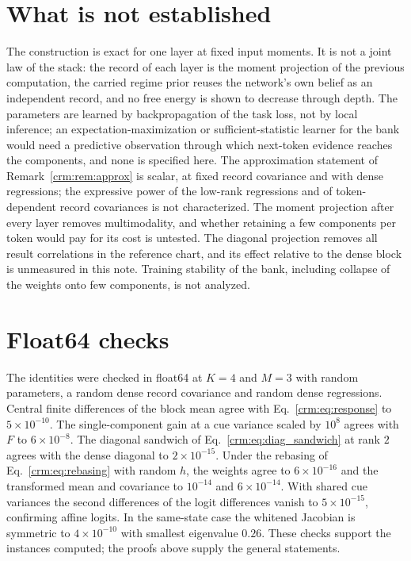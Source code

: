 \documentclass[11pt]{article}
\theoremstyle{definition}
\theoremstyle{remark}
\begin{document}
\section{What is not established}
\label{crm:sec:open}

The construction is exact for one layer at fixed input moments. It is not a joint law of the stack: the record of each layer is the moment projection of the previous computation, the carried regime prior reuses the network's own belief as an independent record, and no free energy is shown to decrease through depth. The parameters are learned by backpropagation of the task loss, not by local inference; an expectation-maximization or sufficient-statistic learner for the bank would need a predictive observation through which next-token evidence reaches the components, and none is specified here. The approximation statement of Remark~\ref{crm:rem:approx} is scalar, at fixed record covariance and with dense regressions; the expressive power of the low-rank regressions and of token-dependent record covariances is not characterized. The moment projection after every layer removes multimodality, and whether retaining a few components per token would pay for its cost is untested. The diagonal projection removes all result correlations in the reference chart, and its effect relative to the dense block is unmeasured in this note. Training stability of the bank, including collapse of the weights onto few components, is not analyzed.

\appendix

\section{Float64 checks}
\label{crm:app:checks}

The identities were checked in float64 at $K=4$ and $M=3$ with random parameters, a random dense record covariance and random dense regressions. Central finite differences of the block mean agree with Eq.~\eqref{crm:eq:response} to $5\times10^{-10}$. The single-component gain at a cue variance scaled by $10^8$ agrees with $F$ to $6\times10^{-8}$. The diagonal sandwich of Eq.~\eqref{crm:eq:diag_sandwich} at rank $2$ agrees with the dense diagonal to $2\times10^{-15}$. Under the rebasing of Eq.~\eqref{crm:eq:rebasing} with random $h$, the weights agree to $6\times10^{-16}$ and the transformed mean and covariance to $10^{-14}$ and $6\times10^{-14}$. With shared cue variances the second differences of the logit differences vanish to $5\times10^{-15}$, confirming affine logits. In the same-state case the whitened Jacobian is symmetric to $4\times10^{-10}$ with smallest eigenvalue $0.26$. These checks support the instances computed; the proofs above supply the general statements.



\end{document}
